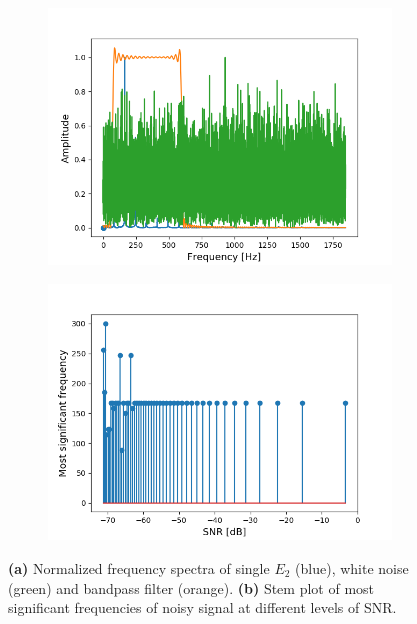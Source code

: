 \begin{figure}[H]
\begin{subfigure}{0.49\textwidth}
\centering
\includegraphics[width=\textwidth]{figures/SNR/white_spectrum.png}
\caption{}
\label{fig:white_spectrum}
\end{subfigure}
\begin{subfigure}{0.49\textwidth}
\centering
\includegraphics[width=\textwidth]{figures/SNR/white_stem.png}
\caption{}
\label{fig:white_stem}
\end{subfigure}
\caption{\textbf{(a)} Normalized frequency spectra of single $E_2$ (blue), white noise (green) and bandpass filter (orange). \textbf{(b)} Stem plot of most significant frequencies of noisy signal at different levels of SNR.}
\label{fig:white_noise}
\end{figure}


